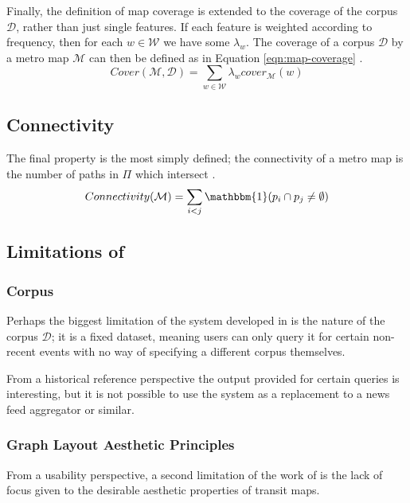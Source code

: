 Finally, the definition of map coverage is extended to the coverage of the corpus $\mathcal{D}$, rather than just single features. If each feature is weighted according to frequency, then for each $w \in \mathcal{W}$ we have some $\lambda_w$. The coverage of a corpus $\mathcal{D}$ by a metro map $\mathcal{M}$ can then be defined as in Equation \ref{eqn:map-coverage} \citep{GeneratingInformationMaps}.
\begin{equation}
	\label{eqn:map-coverage}
	Cover(\mathcal{M}, \mathcal{D}) = \sum_{w \in \mathcal{W}}\lambda_w cover_\mathcal{M}(w)
\end{equation}

\subsection{Connectivity}
The final property is the most simply defined; the connectivity of a metro map is the number of paths in $\Pi$ which intersect \citep{GeneratingInformationMaps}.
\begin{equation}
	Connectivity(\mathcal{M}) = \sum_{i<j}\mathbbm{1}(p_i \cap p_j \neq\emptyset)
\end{equation}

\subsection{Limitations of \citep{GeneratingInformationMaps, InformationCartographyPre}}

\subsubsection{Corpus}
Perhaps the biggest limitation of the system developed in \citep{GeneratingInformationMaps, InformationCartographyPre} is the nature of the corpus $\mathcal{D}$; it is a fixed dataset, meaning users can only query it for certain non-recent events with no way of specifying a different corpus themselves. 

From a historical reference perspective the output provided for certain queries is interesting, but it is not possible to use the system as a replacement to a news feed aggregator or similar. 

\subsubsection{Graph Layout Aesthetic Principles}

From a usability perspective, a second limitation of the work of \citeauthor{GeneratingInformationMaps} is the lack of focus given to the desirable aesthetic properties of transit maps.

